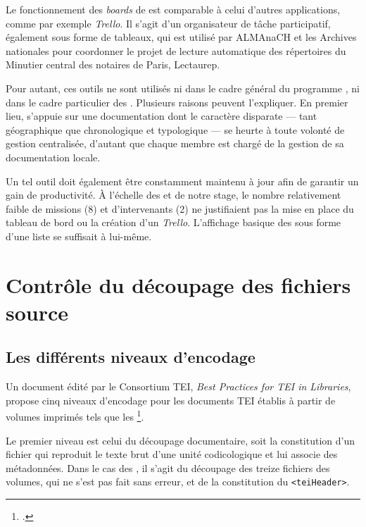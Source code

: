 Le fonctionnement des \textit{boards} de \gitlab{} est comparable à celui d'autres applications, comme par exemple \textit{Trello}. Il s'agit d'un organisateur de tâche participatif, également sous forme de tableaux, qui est utilisé par ALMAnaCH et les Archives nationales pour coordonner le projet de lecture automatique des répertoires du Minutier central des notaires de Paris, Lectaurep.

Pour autant, ces outils ne sont utilisés ni dans le cadre général du programme \timeus, ni dans le cadre particulier des \odm. Plusieurs raisons peuvent l'expliquer. En premier lieu, \timeus{} s'appuie sur une documentation dont le caractère disparate --- tant géographique que chronologique et typologique --- se heurte à toute volonté de gestion centralisée, d'autant que chaque membre est chargé de la gestion de sa documentation locale.

Un tel outil doit également être constamment maintenu à jour afin de garantir un gain de productivité. À l'échelle des \odm{} et de notre stage, le nombre relativement faible de missions (8) et d'intervenants (2) ne justifiaient pas la mise en place du tableau de bord \gitlab{} ou la création d'un \textit{Trello}. L'affichage basique des \issues{} sous forme d'une liste se suffisait à lui-même.

\newpage
\thispagestyle{empty}
\mbox{}
\newpage

\chapter{Contrôle du découpage des fichiers source}

\section{Les différents niveaux d'encodage}

Un document édité par le Consortium TEI, \textit{Best Practices for TEI in Libraries}, propose cinq niveaux d'encodage pour les documents TEI établis à partir de volumes imprimés tels que les \lodm\footcite[\textit{4.2. Encoding Levels}]{bestpratice}.

Le premier niveau est celui du découpage documentaire, soit la constitution d'un fichier qui reproduit le texte brut d'une unité codicologique et lui associe des métadonnées. Dans le cas des \odm, il s'agit du découpage des treize fichiers des volumes, qui ne s'est pas fait sans erreur, et de la constitution du \texttt{<teiHeader>}.

